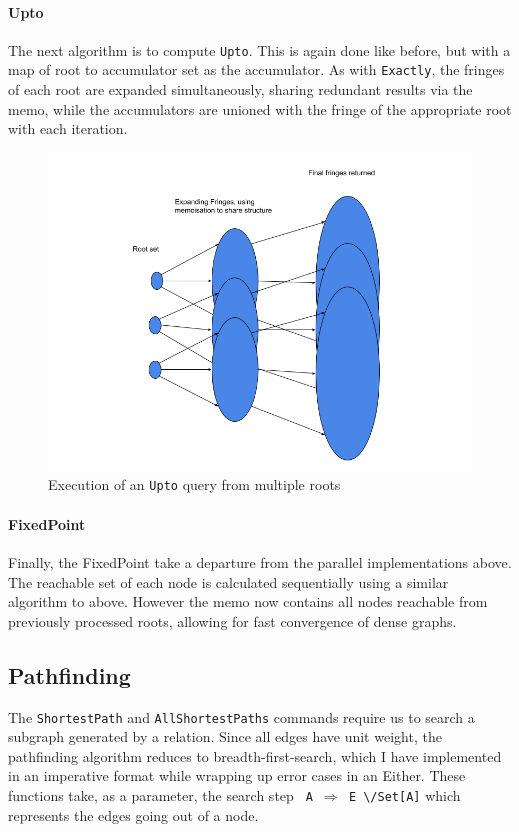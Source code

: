 \documentclass[12pt,a4paper,twoside,openright]{report}
\newcommand\codeName[1]{\texttt{#1}}
\newcommand\either[0]{\textbackslash/}
\begin{document}
		\paragraph{Upto}
The next algorithm is to compute \codeName{Upto}. This is again done like before, but with a map of root to accumulator set as the accumulator. As with \codeName{Exactly}, the fringes of each root are expanded simultaneously, sharing redundant results via the memo, while the accumulators are unioned with the fringe of the appropriate root with each iteration. \begin{figure}[ht]
\centering
  \includegraphics[width=\textwidth]{figs/UptoPairs.png}
  \caption{Execution of an \codeName{Upto} query from multiple roots}
  \label{fig:UptoPairs}
\end{figure}
		
		\paragraph{FixedPoint}
Finally, the FixedPoint take a departure from the parallel implementations above. The reachable set of each node is calculated sequentially using a similar algorithm to above. However the memo now contains all nodes reachable from previously processed roots, allowing for fast convergence of dense graphs.	
	
	\subsection{Pathfinding}
	The \codeName{ShortestPath} and \codeName{AllShortestPaths} commands require us to search a subgraph generated by a relation. Since all edges have unit weight, the pathfinding algorithm reduces to breadth-first-search, which I have implemented in an imperative format while wrapping up error cases in an Either. These functions take, as a parameter, the search step \codeName{ A\ $\Rightarrow$ E \either Set[A]} which represents the edges going out of a node. 
	
\end{document}
